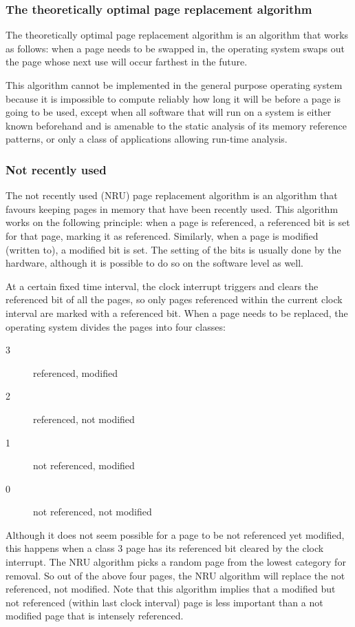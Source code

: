 \documentclass[a4paper, twoside]{article}
\begin{document}
\subsubsection{The theoretically optimal page replacement algorithm}

The theoretically optimal page replacement algorithm is an algorithm that works
as follows: when a page needs to be swapped in, the operating system swaps out
the page whose next use will occur farthest in the future.

This algorithm cannot be implemented in the general purpose operating system
because it is impossible to compute reliably how long it will be before a page
is going to be used, except when all software that will run on a system is
either known beforehand and is amenable to the static analysis of its memory
reference patterns, or only a class of applications allowing run-time analysis.

\subsubsection{Not recently used}

The not recently used (NRU) page replacement algorithm is an algorithm that
favours keeping pages in memory that have been recently used.
This algorithm works on the following principle: when a page is referenced,
a referenced bit is set for that page, marking it as referenced.
Similarly, when a page is modified (written to), a modified bit is set.
The setting of the bits is usually done by the hardware, although it is
possible to do so on the software level as well.

At a certain fixed time interval, the clock interrupt triggers and clears the
referenced bit of all the pages, so only pages referenced within the current
clock interval are marked with a referenced bit.
When a page needs to be replaced, the operating system divides the pages into
four classes:
\begin{description}
  \item[3] referenced, modified
  \item[2] referenced, not modified
  \item[1] not referenced, modified
  \item[0] not referenced, not modified
\end{description}

Although it does not seem possible for a page to be not referenced yet
modified, this happens when a class 3 page has its referenced bit cleared by
the clock interrupt.
The NRU algorithm picks a random page from the lowest category for removal.
So out of the above four pages, the NRU algorithm will replace the not
referenced, not modified.
Note that this algorithm implies that a modified but not referenced (within
last clock interval) page is less important than a not modified page that is
intensely referenced.
\end{document}
